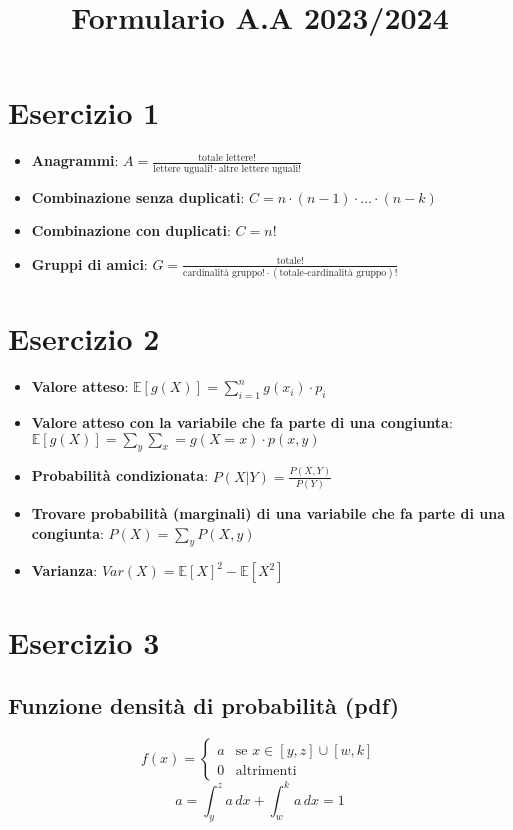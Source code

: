 \documentclass[12pt]{article}
\title{Formulario A.A 2023/2024}
\author{}
\begin{document}
\maketitle
\section{Esercizio 1}
\begin{itemize}
    \item \textbf{Anagrammi}: $A = \frac{\text{totale lettere}!}{\text{lettere uguali}!\cdot\text{altre lettere uguali}!}$
    \item \textbf{Combinazione senza duplicati}: $C = n\cdot (n-1)\cdot\ldots\cdot(n-k)$
    \item \textbf{Combinazione con duplicati}: $C = n!$
    \item \textbf{Gruppi di amici}: $G = \frac{\text{totale}!}{\text{cardinalità gruppo}!\cdot(\text{totale-cardinalità gruppo})!}$
\end{itemize}
\section{Esercizio 2}
\begin{itemize}
    \item \textbf{Valore atteso}: $\mathbb{E}[g(X)] = \sum_{i=1}^{n}g(x_i)\cdot p_i$
    \item \textbf{Valore atteso con la variabile che fa parte di una congiunta}: $\mathbb{E}[g(X)] = \sum_{y}\sum_{x}=g(X=x)\cdot p(x,y)$
    \item \textbf{Probabilità condizionata}: $P(X|Y) = \frac{P(X,Y)}{P(Y)}$
    \item \textbf{Trovare probabilità (marginali) di una variabile che fa parte di una congiunta}: $P(X) = \sum_{y}P(X,y)$
    \item \textbf{Varianza}: $Var(X)=\mathbb{E}[X]^{2}-\mathbb{E}[X^{2}]$
\end{itemize}
\section{Esercizio 3}
\subsection{Funzione densità di probabilità (pdf)}
\begin{equation*}
    f(x) = \begin{cases}
        a & \text{se } x \in [y,z]\cup[w,k]\\
        0 & \text{altrimenti}
    \end{cases}
\end{equation*}
\begin{equation*}
    a = \int_{y}^{z}a \,dx + \int_{w}^{k}a \,dx = 1
\end{equation*}
\end{document}
